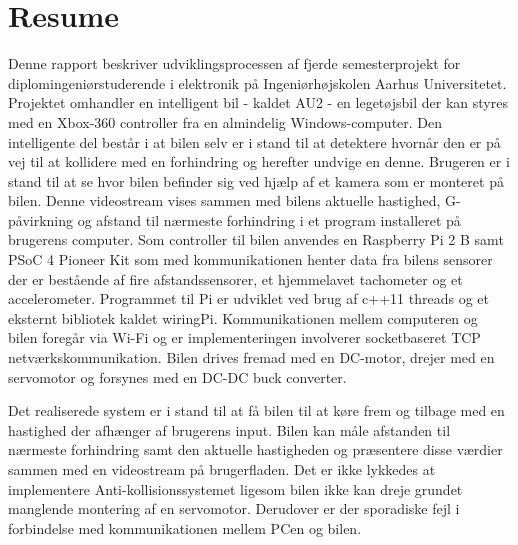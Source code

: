 \chapter{Resume}
\label{ch:Resume}

Denne rapport beskriver udviklingsprocessen af fjerde semesterprojekt for diplomingeniørstuderende i elektronik på Ingeniørhøjskolen Aarhus Universitetet. Projektet omhandler en intelligent bil - kaldet AU2 - en legetøjsbil der kan styres med en Xbox-360 controller fra en almindelig Windows-computer. Den intelligente del består i at bilen selv er i stand til at detektere hvornår den er på vej til at kollidere med en forhindring og herefter undvige en denne. Brugeren er i stand til at se hvor bilen befinder sig ved hjælp af et kamera som er monteret på bilen. Denne videostream vises sammen med bilens aktuelle hastighed, G-påvirkning og  afstand til nærmeste forhindring i et program installeret på brugerens computer.
Som controller til bilen anvendes en Raspberry Pi 2 B samt PSoC 4 Pioneer Kit som med \IIC kommunikationen henter data fra bilens sensorer der er bestående af fire afstandssensorer, et hjemmelavet tachometer og et accelerometer. Programmet til Pi er udviklet ved brug af c++11 threads og et eksternt \IIC bibliotek kaldet wiringPi. Kommunikationen mellem computeren og bilen foregår via Wi-Fi og er implementeringen involverer socketbaseret TCP netværkskommunikation. Bilen drives fremad med en DC-motor, drejer med en servomotor og forsynes med en DC-DC buck converter.

Det realiserede system er i stand til at få bilen til at køre frem og tilbage med en hastighed der afhænger af brugerens input. Bilen kan måle afstanden til nærmeste forhindring samt den aktuelle hastigheden og præsentere disse værdier sammen med en videostream på brugerfladen. Det er ikke lykkedes at implementere Anti-kollisionssystemet ligesom bilen ikke kan dreje grundet manglende montering af en servomotor. Derudover er der sporadiske fejl i forbindelse med kommunikationen mellem PCen og bilen.
\clearpage

